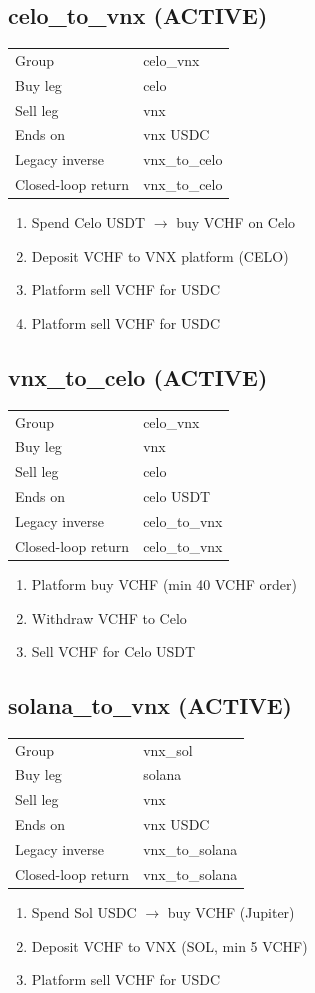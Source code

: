 \documentclass[11pt,a4paper]{article}
\begin{document}
\subsection*{\textcolor{okgreen}{celo\_to\_vnx} (ACTIVE)}
\begin{tabular}{@{}ll@{}}
Group & celo\_vnx \\
Buy leg & celo \\
Sell leg & vnx \\
Ends on & vnx USDC \\
Legacy inverse & vnx\_to\_celo \\
Closed-loop return & vnx\_to\_celo \\
\end{tabular}
\begin{enumerate}[nosep,leftmargin=*]
\item Spend Celo USDT $\rightarrow$ buy VCHF on Celo
\item Deposit VCHF to VNX platform (CELO)
\item Platform sell VCHF for USDC
\item Platform sell VCHF for USDC
\end{enumerate}
\subsection*{\textcolor{okgreen}{vnx\_to\_celo} (ACTIVE)}
\begin{tabular}{@{}ll@{}}
Group & celo\_vnx \\
Buy leg & vnx \\
Sell leg & celo \\
Ends on & celo USDT \\
Legacy inverse & celo\_to\_vnx \\
Closed-loop return & celo\_to\_vnx \\
\end{tabular}
\begin{enumerate}[nosep,leftmargin=*]
\item Platform buy VCHF (min 40 VCHF order)
\item Withdraw VCHF to Celo
\item Sell VCHF for Celo USDT
\end{enumerate}
\subsection*{\textcolor{okgreen}{solana\_to\_vnx} (ACTIVE)}
\begin{tabular}{@{}ll@{}}
Group & vnx\_sol \\
Buy leg & solana \\
Sell leg & vnx \\
Ends on & vnx USDC \\
Legacy inverse & vnx\_to\_solana \\
Closed-loop return & vnx\_to\_solana \\
\end{tabular}
\begin{enumerate}[nosep,leftmargin=*]
\item Spend Sol USDC $\rightarrow$ buy VCHF (Jupiter)
\item Deposit VCHF to VNX (SOL, min 5 VCHF)
\item Platform sell VCHF for USDC
\end{enumerate}
\end{document}
